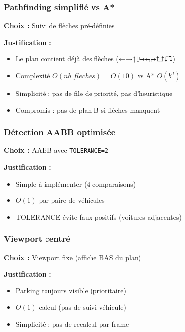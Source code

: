 \documentclass[12pt,a4paper]{article}
\begin{document}
\subsubsection{Pathfinding simplifié vs A*}

\textbf{Choix :} Suivi de flèches pré-définies

\textbf{Justification :}
\begin{itemize}
    \item Le plan contient déjà des flèches (←→↑↓⮡⮢⮣⮤⮥⮦⮧)
    \item Complexité $O(nb\_fleches) = O(10)$ vs A* $O(b^d)$
    \item Simplicité : pas de file de priorité, pas d'heuristique
    \item Compromis : pas de plan B si flèches manquent
\end{itemize}

\subsubsection{Détection AABB optimisée}

\textbf{Choix :} AABB avec \texttt{TOLERANCE=2}

\textbf{Justification :}
\begin{itemize}
    \item Simple à implémenter (4 comparaisons)
    \item $O(1)$ par paire de véhicules
    \item TOLERANCE évite faux positifs (voitures adjacentes)
\end{itemize}

\subsubsection{Viewport centré}

\textbf{Choix :} Viewport fixe (affiche BAS du plan)

\textbf{Justification :}
\begin{itemize}
    \item Parking toujours visible (prioritaire)
    \item $O(1)$ calcul (pas de suivi véhicule)
    \item Simplicité : pas de recalcul par frame
\end{itemize}

\end{document}

